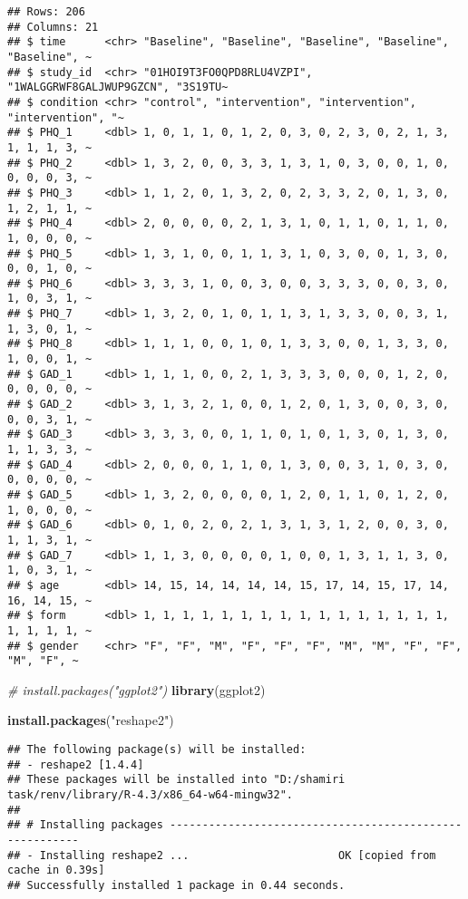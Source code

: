 \documentclass[
]{article}
\newenvironment{Shaded}{\begin{snugshade}}{\end{snugshade}}
\newcommand{\CommentTok}[1]{\textcolor[rgb]{0.56,0.35,0.01}{\textit{#1}}}
\newcommand{\FunctionTok}[1]{\textcolor[rgb]{0.13,0.29,0.53}{\textbf{#1}}}
\newcommand{\NormalTok}[1]{#1}
\newcommand{\StringTok}[1]{\textcolor[rgb]{0.31,0.60,0.02}{#1}}
\begin{document}
\begin{verbatim}
## Rows: 206
## Columns: 21
## $ time      <chr> "Baseline", "Baseline", "Baseline", "Baseline", "Baseline", ~
## $ study_id  <chr> "01HOI9T3FO0QPD8RLU4VZPI", "1WALGGRWF8GALJWUP9GZCN", "3S19TU~
## $ condition <chr> "control", "intervention", "intervention", "intervention", "~
## $ PHQ_1     <dbl> 1, 0, 1, 1, 0, 1, 2, 0, 3, 0, 2, 3, 0, 2, 1, 3, 1, 1, 1, 3, ~
## $ PHQ_2     <dbl> 1, 3, 2, 0, 0, 3, 3, 1, 3, 1, 0, 3, 0, 0, 1, 0, 0, 0, 0, 3, ~
## $ PHQ_3     <dbl> 1, 1, 2, 0, 1, 3, 2, 0, 2, 3, 3, 2, 0, 1, 3, 0, 1, 2, 1, 1, ~
## $ PHQ_4     <dbl> 2, 0, 0, 0, 0, 2, 1, 3, 1, 0, 1, 1, 0, 1, 1, 0, 1, 0, 0, 0, ~
## $ PHQ_5     <dbl> 1, 3, 1, 0, 0, 1, 1, 3, 1, 0, 3, 0, 0, 1, 3, 0, 0, 0, 1, 0, ~
## $ PHQ_6     <dbl> 3, 3, 3, 1, 0, 0, 3, 0, 0, 3, 3, 3, 0, 0, 3, 0, 1, 0, 3, 1, ~
## $ PHQ_7     <dbl> 1, 3, 2, 0, 1, 0, 1, 1, 3, 1, 3, 3, 0, 0, 3, 1, 1, 3, 0, 1, ~
## $ PHQ_8     <dbl> 1, 1, 1, 0, 0, 1, 0, 1, 3, 3, 0, 0, 1, 3, 3, 0, 1, 0, 0, 1, ~
## $ GAD_1     <dbl> 1, 1, 1, 0, 0, 2, 1, 3, 3, 3, 0, 0, 0, 1, 2, 0, 0, 0, 0, 0, ~
## $ GAD_2     <dbl> 3, 1, 3, 2, 1, 0, 0, 1, 2, 0, 1, 3, 0, 0, 3, 0, 0, 0, 3, 1, ~
## $ GAD_3     <dbl> 3, 3, 3, 0, 0, 1, 1, 0, 1, 0, 1, 3, 0, 1, 3, 0, 1, 1, 3, 3, ~
## $ GAD_4     <dbl> 2, 0, 0, 0, 1, 1, 0, 1, 3, 0, 0, 3, 1, 0, 3, 0, 0, 0, 0, 0, ~
## $ GAD_5     <dbl> 1, 3, 2, 0, 0, 0, 0, 1, 2, 0, 1, 1, 0, 1, 2, 0, 1, 0, 0, 0, ~
## $ GAD_6     <dbl> 0, 1, 0, 2, 0, 2, 1, 3, 1, 3, 1, 2, 0, 0, 3, 0, 1, 1, 3, 1, ~
## $ GAD_7     <dbl> 1, 1, 3, 0, 0, 0, 0, 1, 0, 0, 1, 3, 1, 1, 3, 0, 1, 0, 3, 1, ~
## $ age       <dbl> 14, 15, 14, 14, 14, 14, 15, 17, 14, 15, 17, 14, 16, 14, 15, ~
## $ form      <dbl> 1, 1, 1, 1, 1, 1, 1, 1, 1, 1, 1, 1, 1, 1, 1, 1, 1, 1, 1, 1, ~
## $ gender    <chr> "F", "F", "M", "F", "F", "F", "M", "M", "F", "F", "M", "F", ~
\end{verbatim}

\begin{Shaded}
\begin{Highlighting}[]
\CommentTok{\# install.packages("ggplot2")}
\FunctionTok{library}\NormalTok{(ggplot2)}

\FunctionTok{install.packages}\NormalTok{(}\StringTok{"reshape2"}\NormalTok{)}
\end{Highlighting}
\end{Shaded}

\begin{verbatim}
## The following package(s) will be installed:
## - reshape2 [1.4.4]
## These packages will be installed into "D:/shamiri task/renv/library/R-4.3/x86_64-w64-mingw32".
## 
## # Installing packages --------------------------------------------------------
## - Installing reshape2 ...                       OK [copied from cache in 0.39s]
## Successfully installed 1 package in 0.44 seconds.
\end{verbatim}
\end{document}
